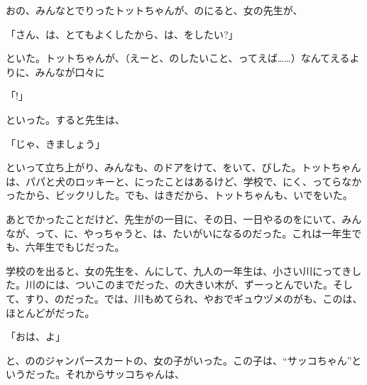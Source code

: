おの、みんなとでりったトットちゃんが、のにると、女の先生が、

「さん、は、とてもよくしたから、は、をしたい?」

といた。トットちゃんが、（えーと、のしたいこと、ってえば……）なんてえるよりに、みんなが口々に

「!」

といった。すると先生は、

「じゃ、きましょう」

といって立ち上がり、みんなも、のドアをけて、をいて、びした。トットちゃんは、パパと犬のロッキーと、にったことはあるけど、学校で、にく、ってらなかったから、ビックリした。でも、はきだから、トットちゃんも、いでをいた。

あとでかったことだけど、先生がの一目に、その日、一日やるのをにいて、みんなが、って、に、やっちゃうと、は、たいがいになるのだった。これは一年生でも、六年生でもじだった。

学校のを出ると、女の先生を、んにして、九人の一年生は、小さい川にってきした。川のには、ついこのまでだった、の大きい木が、ずーっとんでいた。そして、すり、のだった。では、川もめてられ、やおでギュウヅメのがも、このは、ほとんどがだった。

「おは、よ」

と、ののジャンパースカートの、女の子がいった。この子は、“サッコちゃん”というだった。それからサッコちゃんは、

